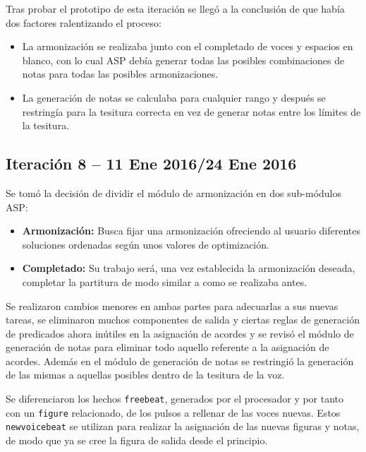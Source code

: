 Tras probar el prototipo de esta iteración se llegó a la conclusión de que había dos factores ralentizando el proceso:
\begin{itemize}
	\item La armonización se realizaba junto con el completado de voces y espacios en blanco, con lo cual ASP debía generar todas las posibles combinaciones de notas para todas las posibles armonizaciones.
	\item La generación de notas se calculaba para cualquier rango y después se restringía para la tesitura correcta en vez de generar notas entre los límites de la tesitura. 
\end{itemize}

\subsection{Iteración 8  -- 11 Ene 2016/24 Ene 2016}
\label{subsec:eighth_iteration}
Se tomó la decisión de dividir el módulo de armonización en dos sub-módulos ASP:
\begin{itemize}
	\item \textbf{Armonización:} Busca fijar una armonización ofreciendo al usuario diferentes soluciones ordenadas según unos valores de optimización.
	\item \textbf{Completado:} Su trabajo será, una vez establecida la armonización deseada, completar la partitura de modo similar a como se realizaba antes.
\end{itemize}

Se realizaron cambios menores en ambas partes para adecuarlas a sus nuevas tareas, se eliminaron muchos componentes de salida y ciertas reglas de generación de predicados ahora inútiles en la asignación de acordes y se revisó el módulo de generación de notas para eliminar todo aquello referente a la asignación de acordes. Además en el módulo de generación de notas se restringió la generación de las mismas a aquellas posibles dentro de la tesitura de la voz.

Se diferenciaron los hechos \texttt{freebeat}, generados por el procesador y por tanto con un \texttt{figure} relacionado, de los pulsos a rellenar de las voces nuevas. Estos \texttt{newvoicebeat} se utilizan para realizar la asignación de las nuevas figuras y notas, de modo que ya se cree la figura de salida desde el principio. 
	
